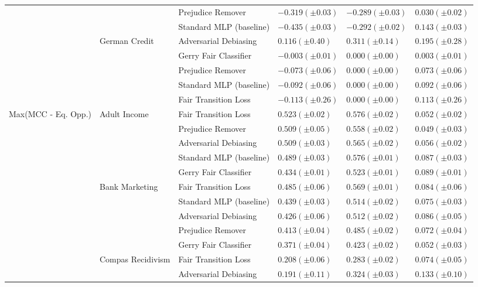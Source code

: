 \begin{tabular}{llllll}
 &  & Prejudice Remover & $-0.319 (\pm0.03)$ & $-0.289 (\pm0.03)$ & $0.030 (\pm0.02)$ \\
 &  & Standard MLP (baseline) & $-0.435 (\pm0.03)$ & $-0.292 (\pm0.02)$ & $0.143 (\pm0.03)$ \\
\cline{2-6}
 & \multirow[t]{5}{*}{German Credit} & Adversarial Debiasing & $0.116 (\pm0.40)$ & $0.311 (\pm0.14)$ & $0.195 (\pm0.28)$ \\
 &  & Gerry Fair Classifier & $-0.003 (\pm0.01)$ & $0.000 (\pm0.00)$ & $0.003 (\pm0.01)$ \\
 &  & Prejudice Remover & $-0.073 (\pm0.06)$ & $0.000 (\pm0.00)$ & $0.073 (\pm0.06)$ \\
 &  & Standard MLP (baseline) & $-0.092 (\pm0.06)$ & $0.000 (\pm0.00)$ & $0.092 (\pm0.06)$ \\
 &  & Fair Transition Loss & $-0.113 (\pm0.26)$ & $0.000 (\pm0.00)$ & $0.113 (\pm0.26)$ \\
\cline{1-6} \cline{2-6}
\multirow[t]{20}{*}{Max(MCC - Eq. Opp.)} & \multirow[t]{5}{*}{Adult Income} & Fair Transition Loss & $0.523 (\pm0.02)$ & $0.576 (\pm0.02)$ & $0.052 (\pm0.02)$ \\
 &  & Prejudice Remover & $0.509 (\pm0.05)$ & $0.558 (\pm0.02)$ & $0.049 (\pm0.03)$ \\
 &  & Adversarial Debiasing & $0.509 (\pm0.03)$ & $0.565 (\pm0.02)$ & $0.056 (\pm0.02)$ \\
 &  & Standard MLP (baseline) & $0.489 (\pm0.03)$ & $0.576 (\pm0.01)$ & $0.087 (\pm0.03)$ \\
 &  & Gerry Fair Classifier & $0.434 (\pm0.01)$ & $0.523 (\pm0.01)$ & $0.089 (\pm0.01)$ \\
\cline{2-6}
 & \multirow[t]{5}{*}{Bank Marketing} & Fair Transition Loss & $0.485 (\pm0.06)$ & $0.569 (\pm0.01)$ & $0.084 (\pm0.06)$ \\
 &  & Standard MLP (baseline) & $0.439 (\pm0.03)$ & $0.514 (\pm0.02)$ & $0.075 (\pm0.03)$ \\
 &  & Adversarial Debiasing & $0.426 (\pm0.06)$ & $0.512 (\pm0.02)$ & $0.086 (\pm0.05)$ \\
 &  & Prejudice Remover & $0.413 (\pm0.04)$ & $0.485 (\pm0.02)$ & $0.072 (\pm0.04)$ \\
 &  & Gerry Fair Classifier & $0.371 (\pm0.04)$ & $0.423 (\pm0.02)$ & $0.052 (\pm0.03)$ \\
\cline{2-6}
 & \multirow[t]{5}{*}{Compas Recidivism} & Fair Transition Loss & $0.208 (\pm0.06)$ & $0.283 (\pm0.02)$ & $0.074 (\pm0.05)$ \\
 &  & Adversarial Debiasing & $0.191 (\pm0.11)$ & $0.324 (\pm0.03)$ & $0.133 (\pm0.10)$ \\

\end{tabular}
